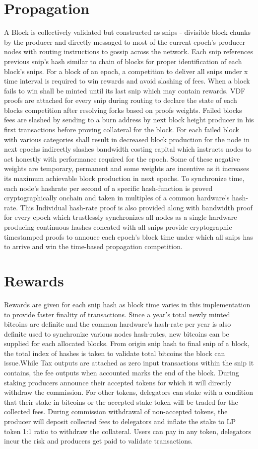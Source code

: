 \documentclass[a4paper,10pt]{article}
\begin{document}
\section{Propagation}
A Block is collectively validated but constructed as snips - divisible block chunks by the producer and directly messaged to most of the current epoch's producer nodes with routing instructions to gossip across the network. Each snip references previous snip's hash similar to chain of blocks for proper identification of each block's snips. For a block of an epoch, a competition to deliver all snips under x time interval is required to win rewards and avoid slashing of fees. When a block fails to win shall be minted until its last snip which may contain rewards. VDF proofs are attached for every snip during routing to declare the state of each blocks competition after resolving forks based on proofs weights. Failed blocks fees are slashed by sending to a burn address by next block height producer in his first transactions before proving collateral for the block. For each failed block with various categories shall result in decreased block production for the node in next epochs indirectly slashes bandwidth costing capital which instructs nodes to act honestly with performance required for the epoch. Some of these negative weights are temporary, permanent and some weights are incentive as it increases its maximum achievable block production in next epochs. To synchronize time, each node's hashrate per second of a specific hash-function is proved cryptographically onchain and taken in multiples of a common hardware's hash-rate. This Individual hash-rate proof is also provided along with bandwidth proof for every epoch which trustlessly synchronizes all nodes as a single hardware producing continuous hashes concated with all snips provide cryptographic timestamped proofs to annouce each epoch's block time under which all snips has to arrive and win the time-based propagation competition.
\section{Rewards}
Rewards are given for each snip hash as block time varies in this implementation to provide faster finality of transactions. Since a year's total newly minted bitcoins are definite and the common hardware's hash-rate per year is also definite used to synchronize various nodes hash-rates, new bitcoins can be supplied for each allocated blocks. From origin snip hash to final snip of a block, the total index of hashes is taken to validate total bitcoins the block can issue.While Tax outputs are attached as zero input transactions within the snip it contains, the fee outputs when accounted marks the end of the block. During staking producers announce their accepted tokens for which it will directly withdraw the commission. For other tokens, delegators can stake with a condition that their stake in bitcoins or the accepted stake token will be traded for the collected fees. During commission withdrawal of non-accepted tokens, the producer will deposit collected fees to delegators and inflate the stake to LP token 1:1 ratio to withdraw the collateral. Users can pay in any token, delegators incur the risk and producers get paid to validate transactions.
\end{document}
